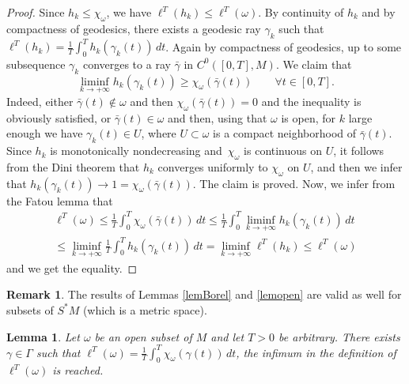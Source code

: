 \documentclass[JEP,XML,SOM,Unicode, NoEqCountersInSection,NoFloatCountersInSection,published]{cedram}
\newtheorem{lemma}{Lemma}
\theoremstyle{definition}
\newtheorem{remark}{Remark}
\begin{document}
\begin{proof}
Since $h_k\leq\chi_{\omega}$, we have $\ell^T(h_k)\leq \ell^T(\omega)$.
By continuity of $h_k$ and by compactness of geodesics, there exists a geodesic ray $\gamma_k$ such that $\ell^T(h_k) = \frac{1}{T} \int_0^T h_k(\gamma_k(t))\, dt$. Again by compactness of geodesics, up to some subsequence $\gamma_k$ converges to a ray $\bar\gamma$ in $C^0([0,T],M)$. We claim that
\[
\liminf_{k\rightarrow+\infty} h_k(\gamma_k(t))\geq \chi_\omega(\bar\gamma(t))\qquad\forall t\in[0,T].
\]
Indeed, either $\bar\gamma(t)\notin\omega$ and then $\chi_\omega(\bar\gamma(t))=0$ and the inequality is obviously satisfied, or $\bar\gamma(t)\in\omega$ and then, using that $\omega$ is open, for $k$ large enough we have $\gamma_k(t)\in U$, where $U\subset\omega$ is a compact neighborhood of $\bar\gamma(t)$. Since $h_k$ is monotonically nondecreasing and~$\chi_\omega$ is continuous on $U$, it follows from the Dini theorem that $h_k$ converges uniformly to $\chi_\omega$ on $U$, and then we infer that $h_k(\gamma_k(t))\rightarrow 1=\chi_\omega(\bar\gamma(t))$. The claim is proved.
Now, we infer from the Fatou lemma that
\begin{multline*}
\ell^T(\omega) \leq \frac{1}{T}\int_0^T\chi_\omega(\bar\gamma(t))\, dt
\leq \frac{1}{T}\int_0^T \liminf_{k\rightarrow+\infty} h_k(\gamma_k(t)) \, dt \\
\leq \liminf_{k\rightarrow+\infty} \frac{1}{T}\int_0^T h_k(\gamma_k(t)) \, dt
= \liminf_{k\rightarrow+\infty} \ell^T(h_k)
\leq \ell^T(\omega)
\end{multline*}
and we get the equality.
\end{proof}

\begin{remark}
The results of Lemmas \ref{lemBorel} and \ref{lemopen} are valid as well for subsets of $S^*M$ (which is a metric space).
\end{remark}

\begin{lemma}\label{lemg2open}
Let $\omega$ be an open subset of $M$ and let $T>0$ be arbitrary.
There exists $\gamma\in\Gamma$ such that $\ell^T(\omega) = \frac{1}{T}\int_0^T\chi_\omega(\gamma(t))\, dt$, \ie the infimum in the definition of $\ell^T(\omega)$ is reached.
\end{lemma}
\end{document}
